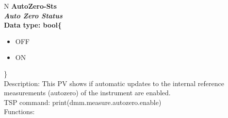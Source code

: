 \documentclass[openany]{article}
\begin{document}
		\begin{tabular}{N}
			\hline
			\bfseries AutoZero-Sts\label{pv:autozero-sts} \\ \hline
			\emph{Auto Zero Status} \\
			Data type: bool\{\begin{itemize}[noitemsep]
				\small
				\item[] OFF
				\item[] ON
			\end{itemize}\} \\
			Description: This PV shows if automatic updates to the internal reference measurements (autozero) of the instrument are enabled. \\
			TSP command: print(dmm.measure.autozero.enable) \\
			Functions: \\
			\arrayrulecolor{\FuncTableBorderColor}

		\end{tabular}
\end{document}
